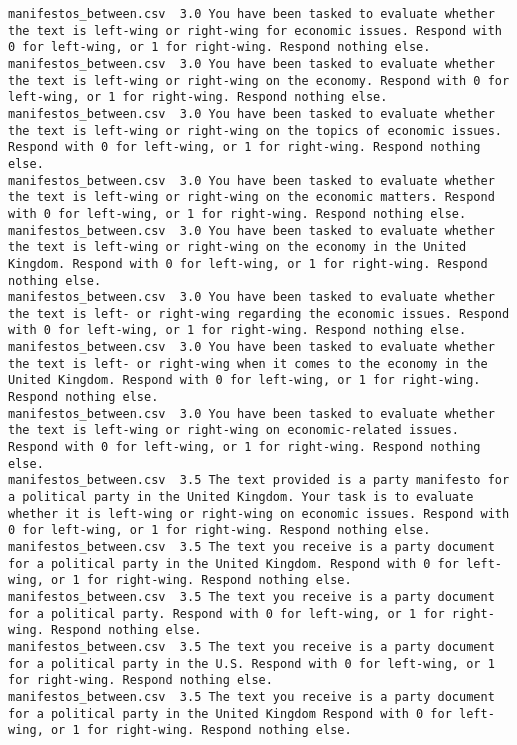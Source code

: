 \begin{lstlisting}
manifestos_between.csv	3.0	You have been tasked to evaluate whether the text is left-wing or right-wing for economic issues. Respond with 0 for left-wing, or 1 for right-wing. Respond nothing else.
manifestos_between.csv	3.0	You have been tasked to evaluate whether the text is left-wing or right-wing on the economy. Respond with 0 for left-wing, or 1 for right-wing. Respond nothing else.
manifestos_between.csv	3.0	You have been tasked to evaluate whether the text is left-wing or right-wing on the topics of economic issues. Respond with 0 for left-wing, or 1 for right-wing. Respond nothing else.
manifestos_between.csv	3.0	You have been tasked to evaluate whether the text is left-wing or right-wing on the economic matters. Respond with 0 for left-wing, or 1 for right-wing. Respond nothing else.
manifestos_between.csv	3.0	You have been tasked to evaluate whether the text is left-wing or right-wing on the economy in the United Kingdom. Respond with 0 for left-wing, or 1 for right-wing. Respond nothing else.
manifestos_between.csv	3.0	You have been tasked to evaluate whether the text is left- or right-wing regarding the economic issues. Respond with 0 for left-wing, or 1 for right-wing. Respond nothing else.
manifestos_between.csv	3.0	You have been tasked to evaluate whether the text is left- or right-wing when it comes to the economy in the United Kingdom. Respond with 0 for left-wing, or 1 for right-wing. Respond nothing else.
manifestos_between.csv	3.0	You have been tasked to evaluate whether the text is left-wing or right-wing on economic-related issues. Respond with 0 for left-wing, or 1 for right-wing. Respond nothing else.
manifestos_between.csv	3.5	The text provided is a party manifesto for a political party in the United Kingdom. Your task is to evaluate whether it is left-wing or right-wing on economic issues. Respond with 0 for left-wing, or 1 for right-wing. Respond nothing else.
manifestos_between.csv	3.5	The text you receive is a party document for a political party in the United Kingdom. Respond with 0 for left-wing, or 1 for right-wing. Respond nothing else.
manifestos_between.csv	3.5	The text you receive is a party document for a political party. Respond with 0 for left-wing, or 1 for right-wing. Respond nothing else.
manifestos_between.csv	3.5	The text you receive is a party document for a political party in the U.S. Respond with 0 for left-wing, or 1 for right-wing. Respond nothing else.
manifestos_between.csv	3.5	The text you receive is a party document for a political party in the United Kingdom Respond with 0 for left-wing, or 1 for right-wing. Respond nothing else.

\end{lstlisting}
